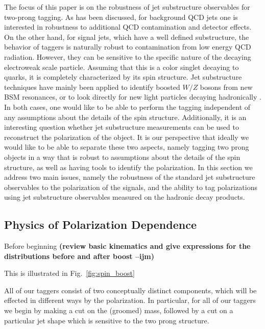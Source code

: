 \documentclass[11pt,letterpaper]{article}
\DeclareRobustCommand{\Fig}[1]{Fig.~\ref{#1}}
\newcommand{\ijm}[1]{\textbf{\textcolor{llblue}{(#1 --ijm)}}}
\begin{document}
The focus of this paper is on the robustness of jet substructure observables for two-prong tagging. As has been discussed, for background QCD jets one is interested in robustness to additional QCD contamination and detector effects. On the other hand, for signal jets, which have a well defined substructure, the behavior of taggers is naturally robust to contamination from low energy QCD radiation. However, they can be sensitive to the specific nature of the decaying electroweak scale particle. Assuming that this is a color singlet decaying to quarks, it is completely characterized by its spin structure. Jet substructure techniques have mainly been applied to identify boosted $W/Z$ bosons from new BSM resonances, or to look directly for new light particles decaying hadronically \cite{CMS-PAS-EXO-17-001}. In both cases, one would like to be able to perform the tagging independent of any assumptions about the details of the spin structure. Additionally, it is an interesting question whether jet substructure measurements can be used to reconstruct the polarization of the object. It is our perspective that ideally we would like to be able to separate these two aspects, namely tagging two prong objects in a way that is robust to assumptions about the details of the spin structure, as well as having tools to identify the polarization. In this section we address two main issues, namely the robustness of the standard jet substructure observables to the polarization of the signals, and the ability to tag polarizations using jet substructure observables measured on the hadronic decay products.



\subsection{Physics of Polarization Dependence}\label{sec:polar_physics}

Before beginning \ijm{review basic kinematics and give expressions for the distributions before and after boost}

This is illustrated in \Fig{fig:spin_boost}



All of our taggers consist of two conceptually distinct components, which will be effected in different ways by the polarization. In particular, for all of our taggers we begin by making a cut on the (groomed) mass, followed by a cut on a particular jet shape which is sensitive to the two prong structure.
\end{document}
